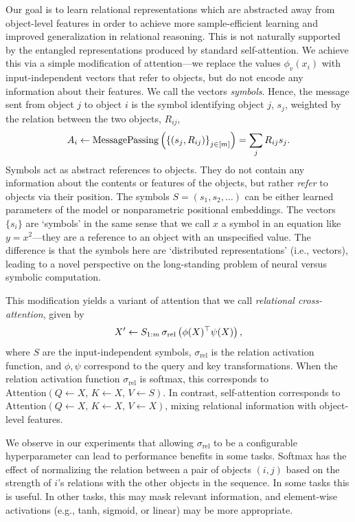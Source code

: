 Our goal is to learn relational representations which are abstracted away from object-level features in order to achieve more sample-efficient learning and improved generalization in relational reasoning. This is not naturally supported by the entangled representations produced by standard self-attention. We achieve this via a simple modification of attention---we replace the values $\phi_v(x_i)$ with input-independent vectors that refer to objects, but do not encode any information about their features. We call the vectors \textit{symbols}. Hence, the message sent from object $j$ to object $i$ is the symbol identifying object $j$, $s_j$, weighted by the relation between the two objects, $R_{ij}$,
\begin{equation}\label{eq:relational_crossattn_message_passing}
    A_i \gets \mathrm{MessagePassing}\left(\left\{(s_j, R_{ij})\right\}_{j \in [m]}\right) = \sum_{j} R_{ij} s_j.
\end{equation}
Symbols act as abstract references to objects. They do not contain any information about the contents or features of the objects, but rather \textit{refer} to objects via their position. The symbols $S = (s_1, s_2, \ldots)$ can be either learned parameters of the model or nonparametric positional embeddings. The vectors $\{s_i\}$ are `symbols' in the same sense that we call $x$ a symbol in an equation like $y = x^2$---they are a reference to an object with an unspecified value. The difference is that the symbols here are `distributed representations' (i.e., vectors), leading to a novel perspective on the long-standing problem of neural versus symbolic computation.

This modification yields a variant of attention that we call \textit{relational cross-attention}, given by
\begin{equation}\label{eq:relational_crossattn}
    X' \gets S_{1:m} \, \sigma_{\mathrm{rel}}\left(\phi(X)^\top \psi(X)\right),
\end{equation}
where $S$ are the input-independent symbols, $\sigma_{\mathrm{rel}}$ is the relation activation function, and $\phi, \psi$ correspond to the query and key transformations. When the relation activation function $\sigma_{\mathrm{rel}}$ is softmax, this corresponds to $\mathrm{Attention}(Q \gets X,\, K \gets X,\, V \gets S)$. In contrast, self-attention corresponds to $\mathrm{Attention}(Q \gets X,\, K \gets X,\, V \gets X)$, mixing relational information with object-level features.

We observe in our experiments that allowing $\sigma_{\mathrm{rel}}$ to be a configurable hyperparameter can lead to performance benefits in some tasks. Softmax has the effect of normalizing the relation between a pair of objects $(i,j)$ based on the strength of $i$'s relations with the other objects in the sequence. In some tasks this is useful. In other tasks, this may mask relevant information, and element-wise activations (e.g., tanh, sigmoid, or linear) may be more appropriate.

